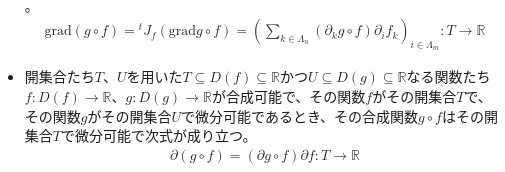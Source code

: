 \documentclass[dvipdfmx]{jsarticle}
\begin{document}
\begin{thm}[連鎖律の系]
\begin{itemize}
{\begin{align*}
  \end{align*}}。
\begin{align*}
\mathrm{grad}(g \circ f) ={}^{t}J_{f}\left( \mathrm{grad}g \circ f \right) = \left( \sum_{k \in \varLambda_{n}} {\left( \partial_{k}g \circ f \right)\partial_{i}f_{k}} \right)_{i \in \varLambda_{m}}:T \rightarrow \mathbb{R}
\end{align*}
\item
  開集合たち$T$、$U$を用いた$T \subseteq D(f) \subseteq \mathbb{R}$かつ$U \subseteq D(g) \subseteq \mathbb{R}$なる関数たち$f:D(f) \rightarrow \mathbb{R}$、$g:D(g) \rightarrow \mathbb{R}$が合成可能で、その関数$f$がその開集合$T$で、その関数$g$がその開集合$U$で微分可能であるとき、その合成関数$g \circ f$はその開集合$T$で微分可能で次式が成り立つ。
\begin{align*}
\partial(g \circ f) = (\partial g \circ f)\partial f:T \rightarrow \mathbb{R}
\end{align*}
\end{itemize}
\end{thm}
\end{document}
